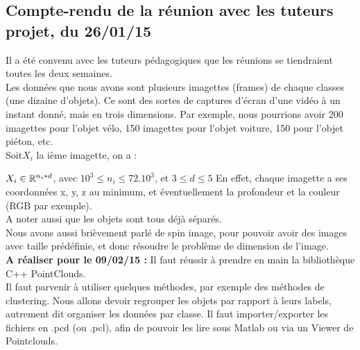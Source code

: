 \subsection{Compte-rendu de la réunion avec les tuteurs projet, du 26/01/15}

Il a été convenu avec les tuteurs pédagogiques que les réunions se tiendraient toutes les deux semaines. \\

Les données que nous avons sont plusieurs imagettes (frames) de chaque classes (une dizaine d'objets). Ce sont des sortes de captures d'écran d'une vidéo à un instant donné, mais en trois dimensions. Par exemple, nous pourrions avoir 200 imagettes pour l'objet vélo, 150 imagettes pour l'objet voiture, 150 pour l'objet piéton, etc.  \\

Soit$ X_{i}$ la ième imagette, on a :

$  X_{i} \in \mathbb{R}^{n_{i}*d} $, avec $10^{3} \leq n_{i} \leq 72.10^{3}$, et  $3 \leq d \leq 5$
En effet, chaque imagette a ses coordonnées x, y, z au minimum, et éventuellement la profondeur et la couleur (RGB par exemple). \\ 

A noter aussi que les objets sont tous déjà séparés. \\

Nous avons aussi brièvement parlé de spin image, pour pouvoir avoir des images avec taille prédéfinie, et donc résoudre le problème de dimension de l'image. \\

\textbf{A réaliser pour le 09/02/15 : }
Il faut réussir à prendre en main la bibliothèque C++ PointClouds.\\
Il faut parvenir à utiliser quelques méthodes, par exemple des méthodes de clustering. Nous allons devoir regrouper les objets par rapport à leurs labels, autrement dit organiser les données par classe. Il faut importer/exporter les fichiers en .pcd (ou .pcl), afin de pouvoir les lire sous Matlab ou via un Viewer de Pointclouds.